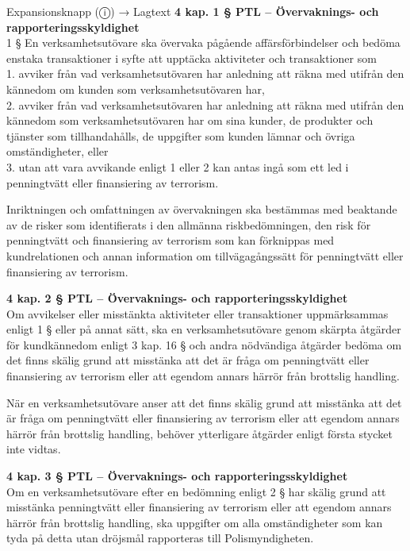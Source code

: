 \documentclass[10pt]{beamer}
\begin{document}
\begin{frame}[label=riskfragor-steg1]
\begin{alertblock}{Expansionsknapp (ⓘ) → Lagtext}
    \tiny \textbf{4 kap. 1 § PTL – Övervaknings- och rapporteringsskyldighet}\\
    \tiny 1 §   En verksamhetsutövare ska övervaka pågående affärsförbindelser och bedöma
     enstaka transaktioner i syfte att upptäcka aktiviteter och transaktioner som\\
    \tiny 1. avviker från vad verksamhetsutövaren har anledning att räkna med utifrån
     den kännedom om kunden som verksamhetsutövaren har,\\
    \tiny 2. avviker från vad verksamhetsutövaren har anledning att räkna med utifrån den
     kännedom som verksamhetsutövaren har om sina kunder, de produkter och tjänster som tillhandahålls, 
     de uppgifter som kunden lämnar och övriga omständigheter, eller\\
    \tiny 3. utan att vara avvikande enligt 1 eller 2 kan antas ingå som ett led i penningtvätt eller
     finansiering av terrorism.

    \tiny Inriktningen och omfattningen av övervakningen ska bestämmas med beaktande av de risker
     som identifierats i den allmänna riskbedömningen, den risk för penningtvätt och finansiering 
     av terrorism som kan förknippas med kundrelationen och annan information om tillvägagångssätt 
     för penningtvätt eller finansiering av terrorism.

    \tiny \textbf{4 kap. 2 § PTL – Övervaknings- och rapporteringsskyldighet}\\
    \tiny Om avvikelser eller misstänkta aktiviteter eller transaktioner uppmärksammas
     enligt 1 § eller på annat sätt, ska en verksamhetsutövare genom skärpta åtgärder för 
     kundkännedom enligt 3 kap. 16 § och andra nödvändiga åtgärder bedöma om det finns skälig grund 
     att misstänka att det är fråga om penningtvätt eller finansiering av terrorism eller att 
     egendom annars härrör från brottslig handling.

    \tiny När en verksamhetsutövare anser att det finns skälig grund att misstänka att det är
     fråga om penningtvätt eller finansiering av terrorism eller att egendom annars härrör 
     från brottslig handling, behöver ytterligare åtgärder enligt första stycket inte vidtas.

    \tiny \textbf{4 kap. 3 § PTL – Övervaknings- och rapporteringsskyldighet}\\
    \tiny Om en verksamhetsutövare efter en bedömning enligt 2 § har skälig grund att 
    misstänka penningtvätt eller finansiering av terrorism eller att egendom annars härrör 
    från brottslig handling, ska uppgifter om alla omständigheter som kan tyda på detta utan 
    dröjsmål rapporteras till Polismyndigheten.


\end{alertblock}
\end{frame}
\end{document}
